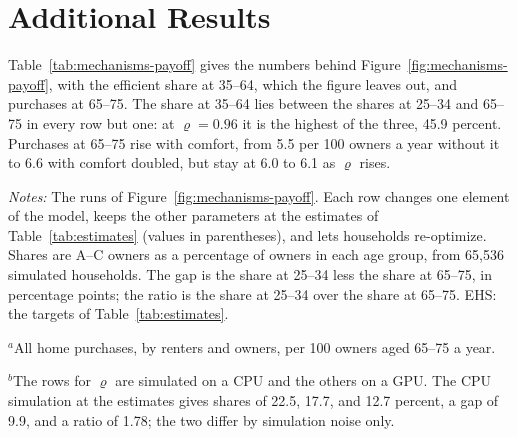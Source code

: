 \section{Additional Results}\label{app:results-more}

Table~\ref{tab:mechanisms-payoff} gives the numbers behind
Figure~\ref{fig:mechanisms-payoff}, with the efficient share at 35--64,
which the figure leaves out, and purchases at 65--75. The share at 35--64
lies between the shares at 25--34 and 65--75 in every row but one: at
$\varrho=0.96$ it is the highest of the three, 45.9 percent. Purchases at
65--75 rise with comfort, from 5.5 per 100 owners a year without it to 6.6
with comfort doubled, but stay at 6.0 to 6.1 as $\varrho$ rises.

\begin{table}[htbp]
  \centering
  \caption[The efficient share of owners when the payoff changes]{The efficient share of owners when the payoff changes}\label{tab:mechanisms-payoff}
  \begin{threeparttable}
    \small
    \begin{tablenotes}[flushleft]\footnotesize
      \item \textit{Notes:} The runs of
      Figure~\ref{fig:mechanisms-payoff}. Each row changes one element of the
      model, keeps the other parameters at the estimates of
      Table~\ref{tab:estimates} (values in parentheses), and lets households
      re-optimize. Shares are A--C owners as a percentage of owners in each
      age group, from 65,536 simulated households. The gap is the share at
      25--34 less the share at 65--75, in percentage points; the ratio is
      the share at 25--34 over the share at 65--75. EHS: the targets of
      Table~\ref{tab:estimates}.
      \item $^a$All home purchases, by renters and owners, per 100
      owners aged 65--75 a year.
      \item $^b$The rows for $\varrho$ are simulated on a CPU and the
      others on a GPU. The CPU simulation at the estimates gives shares of
      22.5, 17.7, and 12.7 percent, a gap of 9.9, and a ratio of 1.78; the
      two differ by simulation noise only.
    \end{tablenotes}
  \end{threeparttable}
\end{table}
